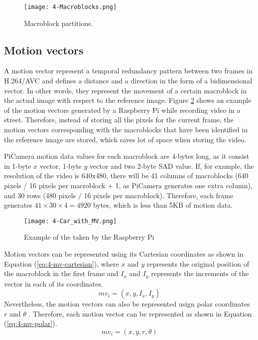 \begin{figure}[!h]
	\begin{center}
		\texttt{[image: 4-Macroblocks.png]}
		\caption{Macroblock partitions.}
		\label{fig:4-Macroblocks}
	\end{center}
\end{figure}


\subsection{Motion vectors}
A motion vector represent a temporal redundancy pattern between two frames in H.264/AVC and defines a distance and a direction in the form of a bidimensional vector. In other words, they represent the movement of a certain macroblock in the actual image with respect to the reference image. Figure \ref{fig:4-Car_with_MV} shows an example of the motion vectors generated by a Raspberry Pi while recording video in a street. Therefore, instead of storing all the pixels for the current frame, the motion vectors corresponding with the macroblocks that have been identified in the reference image are stored, which saves lot of space when storing the video.

PiCamera motion data values for each macroblock are 4-bytes long, as it consist in 1-byte $x$ vector, 1-byte $y$ vector and two 2-byte \ac{SAD} value. If, for example, the resolution of the video is 640x480, there will be 41 columns of macroblocks (640 pixels / 16 pixels per macroblock + 1, as PiCamera generates one extra column), and 30 rows (480 pixels / 16 pixels per macroblock). Therefore, each frame generates $41\times30\times4 = 4920$ bytes, which is less than 5KB of motion data.

\begin{figure}[!h]
	\begin{center}
		\texttt{[image: 4-Car\_with\_MV.png]}
		\caption{Example of  the  taken by the Raspberry Pi}
		\label{fig:4-Car_with_MV}
	\end{center}
\end{figure}

Motion vectors can be represented using its Cartesian coordinates as shown in Equation (\ref{eq:4-mv-cartesian}), where $x$ and $y$ represents the original position of the macroblock in the first frame and $I_{x}$ and $I_{y}$ represents the increments of the vector in each of its coordinates.
\begin{equation} \label{eq:4-mv-cartesian}
mv_{i} = (x, y, I_{x}, I_{y})
\end{equation}
Nevertheless, the motion vectors can also be represented usign polar coordinates $r$ and $\theta$ \cite{GRMSJ12}. Therefore, each motion vector can be represented as shown in Equation (\ref{eq:4-mv-polar}).
\begin{equation} \label{eq:4-mv-polar}
mv_{i} = (x, y, r, \theta)
\end{equation}






